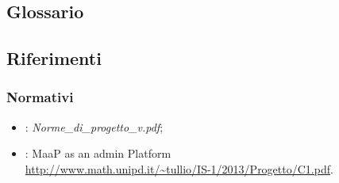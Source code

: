 \subsection{Glossario}%
\label{1.3}
\Glossario{}

\subsection{Riferimenti} %
\label{1.4}
\subsubsection{Normativi}
\label{1.4.1}
\begin{itemize}
\item {}: \emph{Norme\_di\_progetto\_v\versioneNormeDiProgetto{}.pdf};\\
\item {}: MaaP as an admin Platform\\
\url{http://www.math.unipd.it/~tullio/IS-1/2013/Progetto/C1.pdf}.
\end{itemize}
